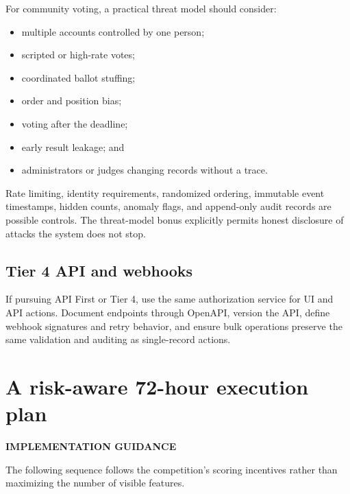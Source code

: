 \documentclass[11pt]{article}
\newcommand{\advisory}{\textcolor{DeepBlue}{\textbf{IMPLEMENTATION GUIDANCE}}}
\begin{document}
For community voting, a practical threat model should consider:

\begin{itemize}
  \item multiple accounts controlled by one person;
  \item scripted or high-rate votes;
  \item coordinated ballot stuffing;
  \item order and position bias;
  \item voting after the deadline;
  \item early result leakage; and
  \item administrators or judges changing records without a trace.
\end{itemize}

Rate limiting, identity requirements, randomized ordering, immutable event timestamps, hidden counts, anomaly flags, and append-only audit records are possible controls. The threat-model bonus explicitly permits honest disclosure of attacks the system does not stop.

\subsection{Tier 4 API and webhooks}

If pursuing API First or Tier 4, use the same authorization service for UI and API actions. Document endpoints through OpenAPI, version the API, define webhook signatures and retry behavior, and ensure bulk operations preserve the same validation and auditing as single-record actions.

\section{A risk-aware 72-hour execution plan}

\advisory\par


The following sequence follows the competition's scoring incentives rather than maximizing the number of visible features.
\end{document}
